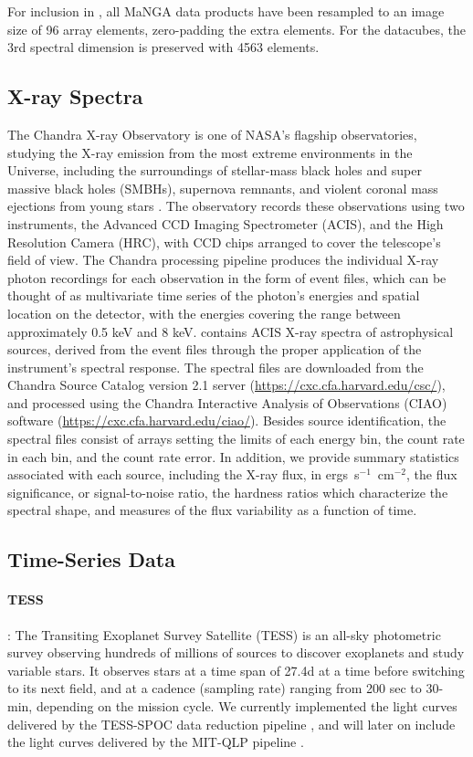 For inclusion in \pile, all MaNGA data products have been resampled to an image size of 96 array elements, zero-padding the extra elements.  For the datacubes, the 3rd spectral dimension is preserved with 4563 elements.

\subsection{X-ray Spectra}
The Chandra X-ray Observatory is one of NASA's flagship observatories, studying the X-ray emission from the most extreme environments in the Universe, including the surroundings of stellar-mass black holes and super massive black holes (SMBHs), supernova remnants, and violent coronal mass ejections from young stars \citep{wilkes19}. The observatory records these observations using two instruments, the Advanced CCD Imaging Spectrometer (ACIS), and the High Resolution Camera (HRC), with CCD chips arranged to cover the telescope's field of view. The Chandra processing pipeline produces the individual X-ray photon recordings for each observation in the form of event files, which can be thought of as multivariate time series of the photon's energies and spatial location on the detector, with the energies covering the range between approximately 0.5 keV and 8 keV. \pile contains ACIS X-ray spectra of astrophysical sources, derived from the event files through the proper application of the instrument's spectral response. The spectral files are downloaded from the Chandra Source Catalog version 2.1 server (\url{https://cxc.cfa.harvard.edu/csc/}), and processed using the Chandra Interactive Analysis of Observations (CIAO) software (\url{https://cxc.cfa.harvard.edu/ciao/}). Besides source identification, the spectral files consist of arrays setting the limits of each energy bin, the count rate in each bin, and the count rate error. In addition, we provide summary statistics associated with each source, including the X-ray flux, in ergs~s$^{-1}$~cm$^{-2}$, the flux significance, or signal-to-noise ratio, the hardness ratios which characterize the spectral shape, and measures of the flux variability as a function of time. 

\subsection{Time-Series Data}\label{app: time-series data}
\paragraph{TESS}: The Transiting Exoplanet Survey Satellite (TESS) \citep{ricker2015} is an all-sky photometric survey observing hundreds of millions of sources to discover exoplanets and study variable stars. It observes stars at a time span of 27.4d at a time before switching to its next field, and at a cadence (sampling rate) ranging from 200 sec to 30-min, depending on the mission cycle. We currently implemented the light curves delivered by the TESS-SPOC data reduction pipeline \citep{Caldwell2020}, and will later on include the light curves delivered by the MIT-QLP pipeline \citep{QLP1Huang2020, QLP3Kunimoto2021}.

